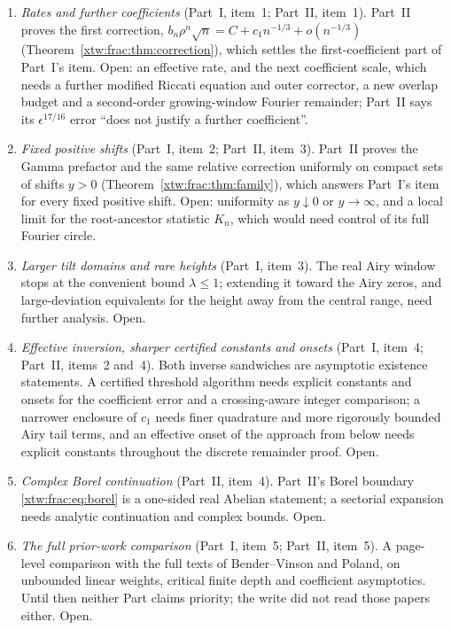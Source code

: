 \documentclass[11pt]{article}
\theoremstyle{remark}\newtheorem{remark}[theorem]{Remark}
\begin{document}
\begin{enumerate}
\item\label{xtw:q:rates} \emph{Rates and further coefficients} (Part~I,
item~1; Part~II, item~1). Part~II proves the first correction,
$b_n\rho^n\sqrt n=C+c_1n^{-1/3}+o(n^{-1/3})$
(Theorem~\ref{xtw:frac:thm:correction}), which settles the first-coefficient
part of Part~I's item. Open: an effective rate, and the next coefficient
scale, which needs a further modified Riccati equation and outer corrector, a
new overlap budget and a second-order growing-window Fourier remainder; Part~II
says its $\epsilon^{17/16}$ error ``does not justify a further coefficient''.
\item\label{xtw:q:shifts} \emph{Fixed positive shifts} (Part~I, item~2;
Part~II, item~3). Part~II proves the Gamma prefactor and the same relative
correction uniformly on compact sets of shifts $y>0$
(Theorem~\ref{xtw:frac:thm:family}), which answers Part~I's item for every
fixed positive shift. Open: uniformity as $y\downarrow0$ or $y\to\infty$, and
a local limit for the root-ancestor statistic $K_n$, which would need control
of its full Fourier circle.
\item\label{xtw:q:tilts} \emph{Larger tilt domains and rare heights}
(Part~I, item~3). The real Airy window stops at the convenient bound
$\lambda\le1$; extending it toward the Airy zeros, and large-deviation
equivalents for the height away from the central range, need further
analysis. Open.
\item\label{xtw:q:effective} \emph{Effective inversion, sharper certified
constants and onsets} (Part~I, item~4; Part~II, items~2 and~4). Both inverse
sandwiches are asymptotic existence statements. A certified threshold
algorithm needs explicit constants and onsets for the coefficient error and a
crossing-aware integer comparison; a narrower enclosure of $c_1$ needs finer
quadrature and more rigorously bounded Airy tail terms, and an effective onset
of the approach from below needs explicit constants throughout the discrete
remainder proof. Open.
\item\label{xtw:q:borel} \emph{Complex Borel continuation} (Part~II,
item~4). Part~II's Borel boundary \eqref{xtw:frac:eq:borel} is a one-sided
real Abelian statement; a sectorial expansion needs analytic continuation and
complex bounds. Open.
\item\label{xtw:q:sources} \emph{The full prior-work comparison} (Part~I,
item~5; Part~II, item~5). A page-level comparison with the full texts of
Bender--Vinson and Poland, on unbounded linear weights, critical finite depth
and coefficient asymptotics. Until then neither Part claims priority; the
write did not read those papers either. Open.
\end{enumerate}
\end{document}
